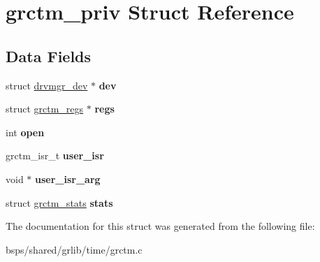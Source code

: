 \hypertarget{structgrctm__priv}{}\section{grctm\+\_\+priv Struct Reference}
\label{structgrctm__priv}
\subsection*{Data Fields}
\begin{DoxyCompactItemize}
\item 
\mbox{\label{structgrctm__priv_a57433e5ed5acc238846f7bae95cbfd0e}} 
struct \mbox{\hyperlink{structdrvmgr__dev}{drvmgr\+\_\+dev}} $\ast$ {\bfseries dev}
\item 
\mbox{\label{structgrctm__priv_a76e5cdf76ab80bad3dd633a9a6c95357}} 
struct \mbox{\hyperlink{structgrctm__regs}{grctm\+\_\+regs}} $\ast$ {\bfseries regs}
\item 
\mbox{\label{structgrctm__priv_a00490315b49357fe96f6e6df9f8987f2}} 
int {\bfseries open}
\item 
\mbox{\label{structgrctm__priv_abc43f071631eb95b48568a8003ee6dd0}} 
grctm\+\_\+isr\+\_\+t {\bfseries user\+\_\+isr}
\item 
\mbox{\label{structgrctm__priv_ab24597edecbdc2e0cb40d471594e16cd}} 
void $\ast$ {\bfseries user\+\_\+isr\+\_\+arg}
\item 
\mbox{\label{structgrctm__priv_ac9e23c414227abf5000d9c94107001c9}} 
struct \mbox{\hyperlink{structgrctm__stats}{grctm\+\_\+stats}} {\bfseries stats}
\end{DoxyCompactItemize}


The documentation for this struct was generated from the following file\+:\begin{DoxyCompactItemize}
\item 
bsps/shared/grlib/time/grctm.\+c\end{DoxyCompactItemize}
